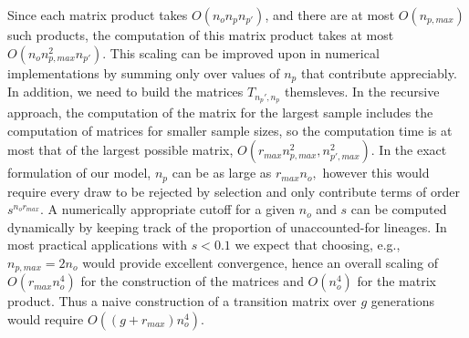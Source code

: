 \documentclass[review,nonatbib]{elsarticle}
\begin{document}
Since each matrix product takes $O(n_o n_p n_{p'})$, and there are at most $O(n_{p,max})$ such products, the computation of this
matrix product takes at most $O(n_o n_{p,max}^2 n_{p'}).$ This scaling can be improved upon in numerical 
implementations by summing only over values of $n_p$ that contribute appreciably. 
In addition, we need to build the matrices $T_{n_p', n_p}$ themsleves. 
In the recursive approach, the computation of the matrix for the largest sample includes the computation of matrices for
smaller sample sizes, so the computation time is at most that of the largest possible matrix, $O(r_{max} n_{p,max}^2, n_{p',max}^2).$ 
In the exact formulation of our model, $n_p$ can be as large as $ r_{max} n_o,$ however this would require every draw to be rejected by selection and
 only contribute terms of order $s^{n_o r_{max}}.$ A numerically appropriate cutoff for a given $n_o$ and $s$ can be computed dynamically 
 by keeping track of the proportion of unaccounted-for lineages. In most practical applications with $s<0.1$ we expect that choosing, e.g.,  
 $n_{p,max}=  2 n_o$ would provide excellent convergence, hence an overall scaling of   $O(r_{max} n_{o}^4)$ for the construction of 
 the matrices and $O(n_o^4)$ for the matrix product.
Thus a naive construction of a transition matrix over $g$ generations would require  $O( (g + r_{max} ) n_o^4).$ 
\end{document}
